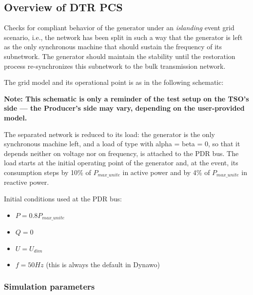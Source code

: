     \subsection{Overview of DTR PCS \DTRPcs}

    Checks for compliant behavior of the generator under an
    \emph{islanding} event grid scenario, i.e., the network has been split in
    such a way that the generator is left as the only synchronous machine
    that should sustain the frequency of its subnetwork. The generator
    should maintain the stability until the restoration process
    re-synchronizes this subnetwork to the bulk transmission network.

    The grid model and its operational point is as in the following schematic:
    \begin{center}
        
    \end{center}
    \begin{center}
        \small \textbf{Note: This schematic is only a reminder of the test setup on the TSO's
        side --- the Producer's side may vary, depending on the user-provided model.}
    \end{center}

    The separated network is reduced to its load: the generator is the only
    synchronous machine left, and a load of type  with
    alpha = beta = 0, so that it depends neither on voltage nor on frequency, is
    attached to the PDR bus. The load starts at the initial operating point of
    the generator and, at the event, its consumption steps by 10\% of
    $P_{max\_unite}$ in active power and by 4\% of $P_{max\_unite}$ in
    reactive power.

    \begin{description}
        \item Initial conditions used at the PDR bus:
        \begin{itemize}
            \item $P = 0.8 P_{max\_unite}$
            \item $Q = 0$
            \item $U = U_{dim}$
            \item $f = 50 Hz$ (this is always the default in Dynawo)
        \end{itemize}
    \end{description}

    \subsubsection{Simulation parameters}

